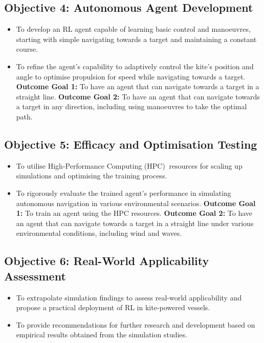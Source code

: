 \subsection*{Objective 4: Autonomous Agent Development}
\begin{itemize}
    \item To develop an RL agent capable of learning basic control and manoeuvres, starting with simple navigating towards a target and maintaining a constant course.
    \item To refine the agent's capability to adaptively control the kite's position and angle to optimise propulsion for speed while navigating towards a target.
    \newline\textbf{Outcome Goal 1:} To have an agent that can navigate towards a target in a straight line.
    \newline\textbf{Outcome Goal 2:} To have an agent that can navigate towards a target in any direction, including using manoeuvres to take the optimal path.
\end{itemize}

\subsection*{Objective 5: Efficacy and Optimisation Testing}
\begin{itemize}
    \item To utilise High-Performance Computing (HPC)$~$\cite{HPC} resources for scaling up simulations and optimising the training process.
    \item To rigorously evaluate the trained agent’s performance in simulating autonomous navigation in various environmental scenarios.
    \newline\textbf{Outcome Goal 1:} To train an agent using the HPC resources.
    \newline\textbf{Outcome Goal 2:} To have an agent that can navigate towards a target in a straight line under various environmental conditions, including wind and waves.
\end{itemize}

\subsection*{Objective 6: Real-World Applicability Assessment}
\begin{itemize}
    \item To extrapolate simulation findings to assess real-world applicability and propose a  practical deployment of RL in kite-powered vessels.
    \item To provide recommendations for further research and development based on empirical results obtained from the simulation studies.
\end{itemize}

